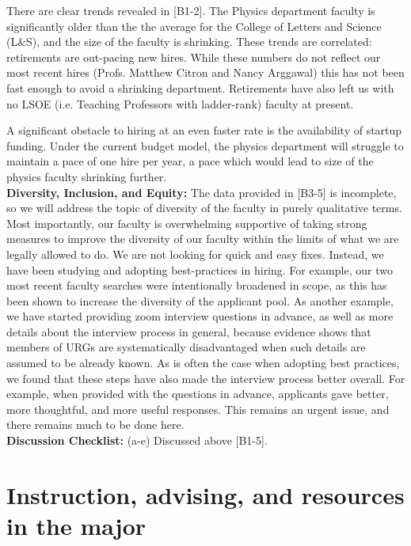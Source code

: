 \documentclass[12pt]{article}
\begin{document}
 There are clear trends
revealed in [B1-2].  The Physics department faculty is significantly
older than the the average for the College of Letters and Science
(L\&S), and the size of the faculty is shrinking.  These trends are
correlated: retirements are out-pacing new hires.  While these numbers
do not reflect our most recent hires (Profs. Matthew Citron and Nancy
Arggawal) this has not been fast enough to avoid a shrinking
department.  Retirements have also left us with no LSOE (i.e. Teaching Professors
with ladder-rank) faculty at present.

A significant obstacle to hiring at an even faster rate is the
availability of startup funding.  Under the current budget model, the
physics department will struggle to maintain a pace of one hire per
year, a pace which would lead to size of the physics faculty shrinking
further.\\[3pt]

\noindent
{\bf Diversity, Inclusion, and Equity:} The data provided in [B3-5] is
incomplete, so we will address the topic of diversity of the faculty
in purely qualitative terms.  Most importantly, our faculty is
overwhelming supportive of taking strong measures to improve the
diversity of our faculty within the limits of what we are legally
allowed to do.  We are not looking for quick and easy fixes.  Instead,
we have been studying and adopting best-practices in hiring.  For
example, our two most recent faculty searches were intentionally
broadened in scope, as this has been shown to increase the diversity
of the applicant pool.  As another example, we have started providing
zoom interview questions in advance, as well as more details about the
interview process in general, because evidence shows that members of
URGs are systematically disadvantaged when such details are assumed to
be already known.  As is often the case when adopting best practices,
we found that these steps have also made the interview process better
overall. For example, when provided with the questions in advance,
applicants gave better, more thoughtful, and more useful responses.
This remains an urgent issue, and there remains much to be done here.\\[3pt]

\noindent
{\bf Discussion Checklist:} (a-e) Discussed above [B1-5].

\newpage
\section{Instruction, advising, and resources in the major}
\label{sec:instruction}
\end{document}
